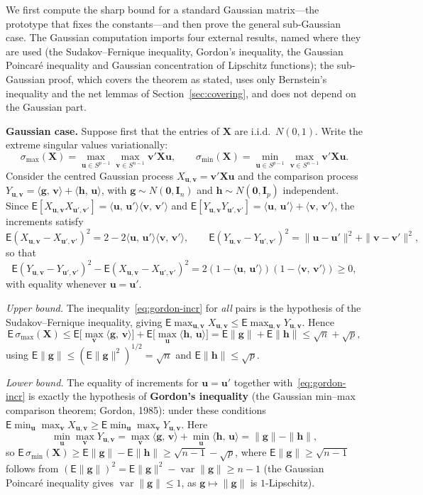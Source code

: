 \documentclass[12pt,a4paper]{article}
\makeatletter
\theoremstyle{definition}
\renewenvironment{proof}[1][\proofname]{\par
  \pushQED{\qed}%
  \normalfont \topsep6\p@\@plus6\p@\relax
  \trivlist
  \item[\hskip\labelsep\bfseries #1\@addpunct{.}]\ignorespaces
}{%
  \popQED\endtrivlist\@endpefalse
}
\newcommand\expc{\mathsf{E}}
\DeclareMathOperator\var{var}
\newcommand{\bX}{\mathbf{X}}
\newcommand{\bI}{\mathbf{I}}
\newcommand{\bzero}{\mathbf{0}}
\newcommand{\bg}{\mathbf{g}}
\newcommand{\bh}{\mathbf{h}}
\newcommand{\bv}{\mathbf{v}}
\newcommand{\bu}{\mathbf{u}}
\newcommand{\ip}[2]{\langle #1,\, #2 \rangle}
\makeatother
\begin{document}
\begin{proof}
We first compute the sharp bound for a standard Gaussian matrix---the prototype that fixes the constants---and then prove the general sub-Gaussian case. The Gaussian computation imports four external results, named where they are used (the Sudakov--Fernique inequality, Gordon's inequality, the Gaussian Poincar\'e inequality and Gaussian concentration of Lipschitz functions); the sub-Gaussian proof, which covers the theorem as stated, uses only Bernstein's inequality and the net lemmas of Section~\ref{sec:covering}, and does not depend on the Gaussian part.

\medskip\noindent\textbf{Gaussian case.} Suppose first that the entries of $\bX$ are i.i.d.\ $N(0,1)$. Write the extreme singular values variationally:
\[
\sigma_{\max}(\bX) = \max_{\bu \in S^{p-1}}\max_{\bv \in S^{n-1}} \bv'\bX\bu, \qquad \sigma_{\min}(\bX) = \min_{\bu \in S^{p-1}}\max_{\bv \in S^{n-1}} \bv'\bX\bu.
\]
Consider the centred Gaussian process $X_{\bu,\bv} = \bv'\bX\bu$ and the comparison process $Y_{\bu,\bv} = \ip{\bg}{\bv} + \ip{\bh}{\bu}$, with $\bg \sim N(\bzero,\bI_n)$ and $\bh \sim N(\bzero,\bI_p)$ independent. Since $\expc[X_{\bu,\bv}X_{\bu',\bv'}] = \ip{\bu}{\bu'}\ip{\bv}{\bv'}$ and $\expc[Y_{\bu,\bv}Y_{\bu',\bv'}] = \ip{\bu}{\bu'} + \ip{\bv}{\bv'}$, the increments satisfy
\[
\expc(X_{\bu,\bv}-X_{\bu',\bv'})^2 = 2 - 2\ip{\bu}{\bu'}\ip{\bv}{\bv'}, \qquad \expc(Y_{\bu,\bv}-Y_{\bu',\bv'})^2 = \|\bu-\bu'\|^2 + \|\bv-\bv'\|^2,
\]
so that
\begin{equation}\label{eq:gordon-incr}
\expc(Y_{\bu,\bv}-Y_{\bu',\bv'})^2 - \expc(X_{\bu,\bv}-X_{\bu',\bv'})^2 = 2(1-\ip{\bu}{\bu'})(1-\ip{\bv}{\bv'}) \geqslant 0,
\end{equation}
with equality whenever $\bu = \bu'$.

\emph{Upper bound.} The inequality~\eqref{eq:gordon-incr} for \emph{all} pairs is the hypothesis of the Sudakov--Fernique inequality, giving $\expc\max_{\bu,\bv} X_{\bu,\bv} \leqslant \expc\max_{\bu,\bv} Y_{\bu,\bv}$. Hence
\[
\expc\,\sigma_{\max}(\bX) \leqslant \expc\Big[\max_{\bv}\ip{\bg}{\bv}\Big] + \expc\Big[\max_{\bu}\ip{\bh}{\bu}\Big] = \expc\|\bg\| + \expc\|\bh\| \leqslant \sqrt{n} + \sqrt{p},
\]
using $\expc\|\bg\| \leqslant (\expc\|\bg\|^2)^{1/2} = \sqrt{n}$ and $\expc\|\bh\| \leqslant \sqrt{p}$.

\emph{Lower bound.} The equality of increments for $\bu=\bu'$ together with~\eqref{eq:gordon-incr} is exactly the hypothesis of \textbf{Gordon's inequality} (the Gaussian min--max comparison theorem; Gordon, 1985): under these conditions $\expc\min_{\bu}\max_{\bv} X_{\bu,\bv} \geqslant \expc\min_{\bu}\max_{\bv} Y_{\bu,\bv}$. Here
\[
\min_{\bu}\max_{\bv} Y_{\bu,\bv} = \max_{\bv}\ip{\bg}{\bv} + \min_{\bu}\ip{\bh}{\bu} = \|\bg\| - \|\bh\|,
\]
so $\expc\,\sigma_{\min}(\bX) \geqslant \expc\|\bg\| - \expc\|\bh\| \geqslant \sqrt{n-1} - \sqrt{p}$, where $\expc\|\bg\| \geqslant \sqrt{n-1}$ follows from $(\expc\|\bg\|)^2 = \expc\|\bg\|^2 - \var\|\bg\| \geqslant n - 1$ (the Gaussian Poincar\'e inequality gives $\var\|\bg\| \leqslant 1$, as $\bg \mapsto \|\bg\|$ is $1$-Lipschitz).


\end{proof}
\end{document}
